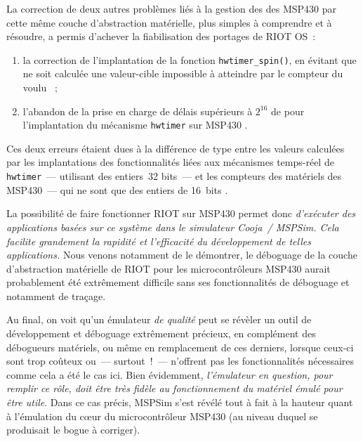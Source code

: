La correction de deux autres problèmes liés à la gestion des 
des MSP430 par cette même couche d'abstraction matérielle, plus simples à
comprendre et à résoudre, a permis d'achever la fiabilisation des portages
de RIOT OS~:
\begin{enumerate}
\item la correction de l'implantation de la fonction \texttt{hwtimer\_spin()},
en évitant que ne soit calculée une valeur-cible impossible à atteindre
par le compteur du  voulu \cite{PRriotFix1MSP430}~;
\item l'abandon de la prise en charge de délais supérieurs à $2^{16}$
 de  pour l'implantation du mécanisme
\texttt{hwtimer} sur MSP430 \cite{PRriotFix3MSP430}.
\end{enumerate}
Ces deux erreurs étaient dues à la différence de type entre les valeurs
calculées par les implantations des fonctionnalités liées aux mécanismes
temps-réel de \texttt{hwtimer}~--- utilisant des entiers~32 bits~--- et
les compteurs des  matériels des MSP430~--- qui ne sont
que des entiers de 16~bits \footnotemark[2].


\medskip

La possibilité de faire fonctionner RIOT sur MSP430 permet donc
\emph{d'exécuter des applications basées sur ce système dans le simulateur
Cooja~/ MSPSim. Cela facilite grandement la rapidité et l'efficacité
du développement de telles applications.} Nous venons notamment de le
démontrer, le déboguage de la couche d'abstraction matérielle de RIOT pour
les microcontrôleurs MSP430 aurait probablement été extrêmement difficile
sans ses fonctionnalités de déboguage et notamment de traçage.

Au final, on voit qu'un émulateur \emph{de qualité} peut se révèler un outil
de développement et déboguage extrêmement précieux, en complément des
débogueurs matériels, ou même en remplacement de ces derniers, lorsque
ceux-ci sont trop coûteux ou~--- surtout~!~--- n'offrent pas les
fonctionnalités nécessaires comme cela a été le cas ici. Bien évidemment,
\emph{l'émulateur en question, pour remplir ce rôle, doit être très fidèle
au fonctionnement du matériel émulé pour être utile}. Dans ce cas précis,
MSPSim s'est révélé tout à fait à la hauteur quant à l'émulation du c{\oe}ur
du microcontrôleur MSP430 (au niveau duquel se produisait le bogue à
corriger).

